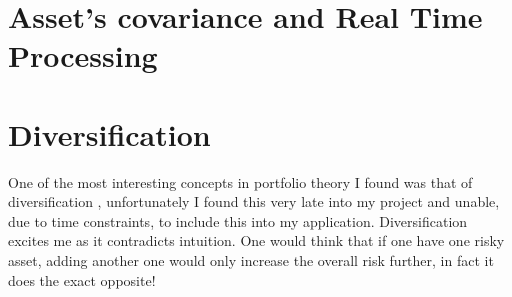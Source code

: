 \documentclass{pdfmx4020}
\begin{document}


  \section{Asset's covariance and Real Time Processing} %
  \label{sec:asset_s_covariance_and_real_time_processing}
  







  \section{Diversification} %
  \label{sec:diversification}
    One of the most interesting concepts in portfolio theory I found was that of diversification \cite{diversification_2}, unfortunately I found this very late into my project and unable, due to time constraints, to include this into my application. Diversification excites me as it contradicts intuition. One would think that if one have one risky asset, adding another one would only increase the overall risk further, in fact it does the exact opposite!
\end{document}
